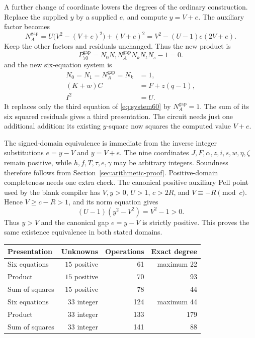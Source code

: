 A further change of coordinate lowers the degrees of the ordinary
construction. Replace the supplied \(y\) by a supplied \(e\), and
compute \(y=V+e\). The auxiliary factor becomes
\begin{equation}
 N_A^{\mathrm{gap}}
  =U\bigl(V^2-(V+e)^2\bigr)+(V+e)^2
  =V^2-(U-1)e(2V+e).
 \label{eq:gap-auxiliary}
\end{equation}
Keep the other factors and residuals unchanged. Thus the new product is
\[
 P_{70}^{\mathrm{gap}}
   =N_0N_1N_A^{\mathrm{gap}}N_kN_tN_s-1=0.
\]
and the new six-equation system is
\begin{equation}\boxed{\begin{aligned}
 N_0=N_1=N_A^{\mathrm{gap}}=N_k&=1,\\
 (K+w)C&=F+z(q-1),\\
 I^2&=U.
\end{aligned}}\label{eq:gap-system61}\end{equation}
It replaces only the third equation of
\eqref{eq:system60} by \(N_A^{\mathrm{gap}}=1\).
The sum of its six squared residuals gives a third presentation.
The circuit needs just one additional addition: its existing
\(y\)-square now squares the computed value \(V+e\).

The signed-domain equivalence is immediate from the inverse integer
substitutions \(e=y-V\) and \(y=V+e\). The nine coordinates
\(J,F,\alpha,z,i,s,w,\eta,\zeta\) remain positive, while
\(h,f,T,\tau,e,\gamma\) may be arbitrary integers. Soundness therefore
follows from Section~\ref{sec:arithmetic-proof}. Positive-domain
completeness needs one extra check. The canonical positive auxiliary
Pell point used by the blank compiler has \(V,y>0\), \(U>1\),
\(c>2R\), and \(V\equiv-R\pmod c\). Hence
\(V\ge c-R>1\), and its norm equation gives
\[
 (U-1)(y^2-V^2)=V^2-1>0.
\]
Thus \(y>V\) and the canonical gap \(e=y-V\) is strictly positive.
This proves the same existence equivalence in both stated domains.

\begin{center}
\begin{tabular}{lrrr}
\toprule
Presentation & Unknowns & Operations & Exact degree\\
\midrule
Six equations & \(15\) positive & 61 & maximum 22\\
Product & \(15\) positive & 70 & 93\\
Sum of squares & \(15\) positive & 78 & 44\\
Six equations & \(33\) integer & 124 & maximum 44\\
Product & \(33\) integer & 133 & 179\\
Sum of squares & \(33\) integer & 141 & 88\\
\bottomrule
\end{tabular}
\end{center}

